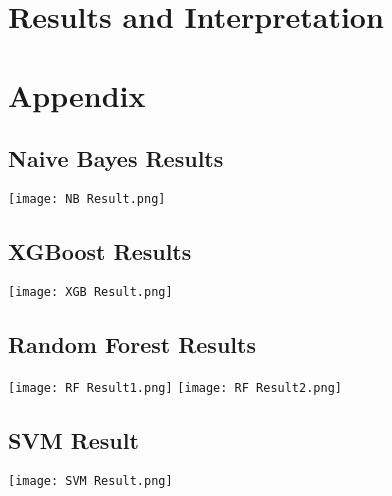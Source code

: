 \documentclass[11pt, a4paper]{article}
\begin{document}
\section{Results and Interpretation}




\newpage
\section{Appendix}
\appendix
\subsection{Naive Bayes Results}
\texttt{[image: NB Result.png]}
\subsection{XGBoost Results}
\texttt{[image: XGB Result.png]}
\subsection{Random Forest Results}
\texttt{[image: RF Result1.png]}
\texttt{[image: RF Result2.png]}
\subsection{SVM Result}
\texttt{[image: SVM Result.png]}
\end{document}
